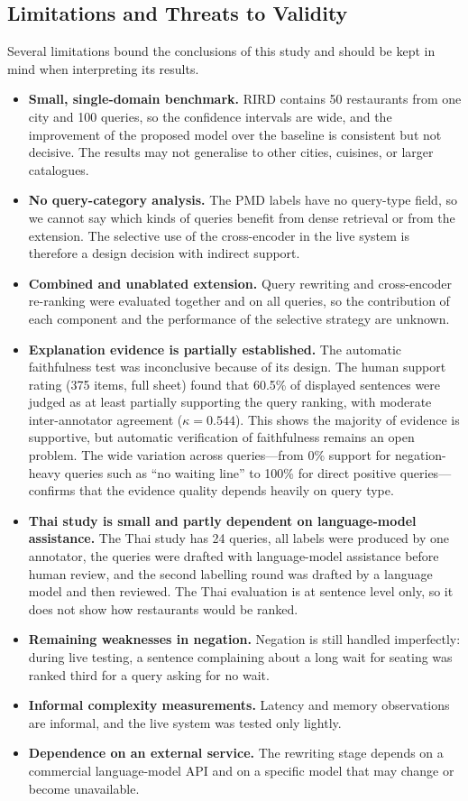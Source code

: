 \subsection{Limitations and Threats to Validity}
\label{sec:disclimits}

Several limitations bound the conclusions of this study and should be kept in mind when interpreting its results.

\begin{itemize}
    \item \textbf{Small, single-domain benchmark.} RIRD contains 50 restaurants from one city and 100 queries, so the confidence intervals are wide, and the improvement of the proposed model over the baseline is consistent but not decisive. The results may not generalise to other cities, cuisines, or larger catalogues.
    \item \textbf{No query-category analysis.} The PMD labels have no query-type field, so we cannot say which kinds of queries benefit from dense retrieval or from the extension. The selective use of the cross-encoder in the live system is therefore a design decision with indirect support.
    \item \textbf{Combined and unablated extension.} Query rewriting and cross-encoder re-ranking were evaluated together and on all queries, so the contribution of each component and the performance of the selective strategy are unknown.
    \item \textbf{Explanation evidence is partially established.} The automatic faithfulness test was inconclusive because of its design. The human support rating (375 items, full sheet) found that 60.5\% of displayed sentences were judged as at least partially supporting the query ranking, with moderate inter-annotator agreement ($\kappa = 0.544$). This shows the majority of evidence is supportive, but automatic verification of faithfulness remains an open problem. The wide variation across queries---from 0\% support for negation-heavy queries such as ``no waiting line'' to 100\% for direct positive queries---confirms that the evidence quality depends heavily on query type.
    \item \textbf{Thai study is small and partly dependent on language-model assistance.} The Thai study has 24 queries, all labels were produced by one annotator, the queries were drafted with language-model assistance before human review, and the second labelling round was drafted by a language model and then reviewed. The Thai evaluation is at sentence level only, so it does not show how restaurants would be ranked.
    \item \textbf{Remaining weaknesses in negation.} Negation is still handled imperfectly: during live testing, a sentence complaining about a long wait for seating was ranked third for a query asking for no wait.
    \item \textbf{Informal complexity measurements.} Latency and memory observations are informal, and the live system was tested only lightly.
    \item \textbf{Dependence on an external service.} The rewriting stage depends on a commercial language-model API and on a specific model that may change or become unavailable.
\end{itemize}

